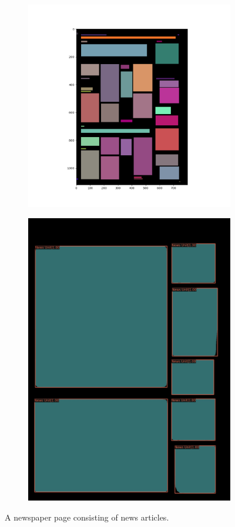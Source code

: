 \documentclass[aspectratio=1610]{beamer}
\begin{document}
\begin{frame}
  \begin{figure}
\centering
\begin{subfigure}{.5\textwidth}
  \centering
  \includegraphics[width=0.7\linewidth, clip=true, trim = 50mm 20mm 60mm 0mm]{figures/tf/AVThDFz.png}
\end{subfigure}%
\begin{subfigure}{.5\textwidth}
  \centering
  \includegraphics[width=0.7\linewidth, clip=true, trim = 0mm 0mm 0mm 0mm]{figures/labels-vanilla-0.75/AVThDFz.jpg}
\end{subfigure}
\caption{A newspaper page consisting of news articles.}
\label{fig:newsarticles}
\end{figure}
\end{frame}
\normalpage
\end{document}
